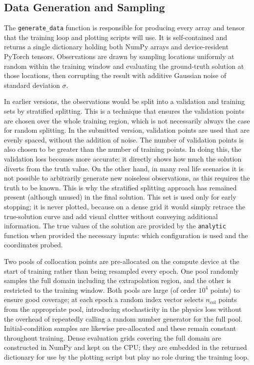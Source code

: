 \documentclass[12pt, a4paper]{report}
\begin{document}
\subsection{Data Generation and Sampling}
The \verb|generate_data| function is responsible for producing every array and tensor that the training loop and plotting scripts will use. It is self-contained and returns a single dictionary holding both NumPy arrays and device-resident PyTorch tensors. Observations are drawn by sampling locations uniformly at random within the training window and evaluating the ground-truth solution at those locations, then corrupting the result with additive Gaussian noise of standard deviation $\sigma$. 

In earlier versions, the observations would be split into a validation and training sets by stratified splitting. This is a technique that ensures the validation points are chosen over the whole training region, which is not necessarily always the case for random splitting. In the submitted version, validation points are used that are evenly spaced, without the addition of noise. The number of validation points is also chosen to be greater than the number of training points. In doing this, the validation loss becomes more accurate: it directly shows how much the solution diverts from the truth value. On the other hand, in many real life scenarios it is not possible to arbitrarily generate new noiseless observations, as this requires the truth to be known. This is why the stratified splitting approach has remained present (although unused) in the final solution. This set is used only for early stopping; it is never plotted, because on a dense grid it would simply retrace the true-solution curve and add visual clutter without conveying additional information. The true values of the solution are provided by the \verb|analytic| function when provided the necessary inputs: which configuration is used and the coordinates probed.

Two pools of collocation points are pre-allocated on the compute device at the start of training rather than being resampled every epoch. One pool randomly samples the full domain including the extrapolation region, and the other is restricted to the training window. Both pools are large (of order $10^4$ points) to ensure good coverage; at each epoch a random index vector selects $n_\text{col}$ points from the appropriate pool, introducing stochasticity in the physics loss without the overhead of repeatedly calling a random number generator for the full pool. Initial-condition samples are likewise pre-allocated and these remain constant throughout training. Dense evaluation grids covering the full domain are constructed in NumPy and kept on the CPU; they are embedded in the returned dictionary for use by the plotting script but play no role during the training loop.
\end{document}
